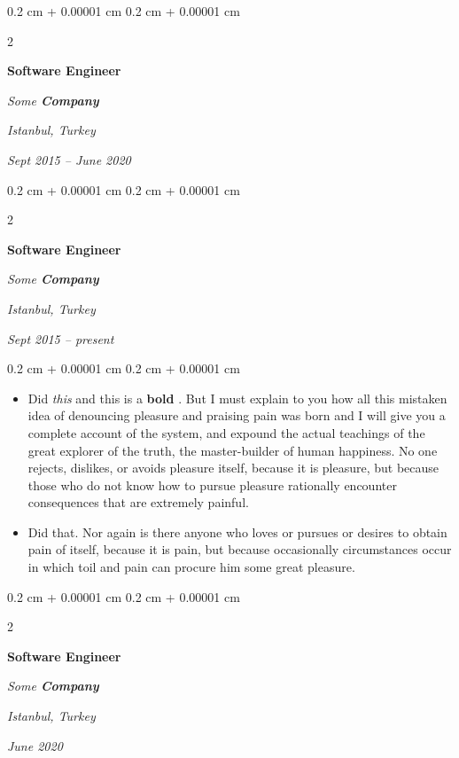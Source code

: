 \documentclass[10pt, letterpaper]{article}
\newenvironment{highlights}{
    \begin{itemize}[
        topsep=0.10 cm,
        parsep=0.10 cm,
        partopsep=0pt,
        itemsep=0pt,
        leftmargin=0.4 cm + 10pt
    ]
}{
    \end{itemize}
} %
\newenvironment{onecolentry}{
    \begin{adjustwidth}{
        0.2 cm + 0.00001 cm
    }{
        0.2 cm + 0.00001 cm
    }
}{
    \end{adjustwidth}
} %
\newenvironment{twocolentry}[2][]{
    \onecolentry
    \def\secondColumn{#2}
    \setcolumnwidth{\fill, 4.5 cm}
    \begin{paracol}{2}
}{
    \switchcolumn \raggedleft \secondColumn
    \end{paracol}
    \endonecolentry
} %
\let\hrefWithoutArrow\href
\renewcommand{\href}[2]{\hrefWithoutArrow{#1}{\ifthenelse{\equal{#2}{}}{ }{#2 }\raisebox{.15ex}{\footnotesize \faExternalLink*}}}
\begin{document}
        \vspace{0.2 cm}

        \begin{twocolentry}{
        \textit{Istanbul, Turkey}    
            
        \textit{Sept 2015 – June 2020}}
            \textbf{Software Engineer}
            
            \textit{Some \textbf{Company}}
        \end{twocolentry}



        \vspace{0.2 cm}

        \begin{twocolentry}{
        \textit{Istanbul, Turkey}    
            
        \textit{Sept 2015 – present}}
            \textbf{Software Engineer}
            
            \textit{Some \textbf{Company}}
        \end{twocolentry}

        \vspace{0.10 cm}
        \begin{onecolentry}
            \begin{highlights}
                \item Did \textit{this} and this is a \textbf{bold} \href{https://example.com}{link}. But I must explain to you how all this mistaken idea of denouncing pleasure and praising pain was born and I will give you a complete account of the system, and expound the actual teachings of the great explorer of the truth, the master-builder of human happiness. No one rejects, dislikes, or avoids pleasure itself, because it is pleasure, but because those who do not know how to pursue pleasure rationally encounter consequences that are extremely painful.
                \item Did that. Nor again is there anyone who loves or pursues or desires to obtain pain of itself, because it is pain, but because occasionally circumstances occur in which toil and pain can procure him some great pleasure.
            \end{highlights}
        \end{onecolentry}


        \vspace{0.2 cm}

        \begin{twocolentry}{
        \textit{Istanbul, Turkey}    
            
        \textit{June 2020}}
            \textbf{Software Engineer}
            
            \textit{Some \textbf{Company}}
        \end{twocolentry}
\end{document}
